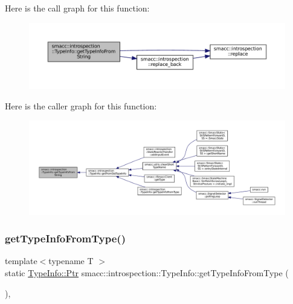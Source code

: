 Here is the call graph for this function\+:
\nopagebreak
\begin{figure}[H]
\begin{center}
\leavevmode
\includegraphics[width=350pt]{classsmacc_1_1introspection_1_1TypeInfo_a47d65b6c61499d7ae8ab9f6325c84837_cgraph}
\end{center}
\end{figure}
Here is the caller graph for this function\+:
\nopagebreak
\begin{figure}[H]
\begin{center}
\leavevmode
\includegraphics[width=350pt]{classsmacc_1_1introspection_1_1TypeInfo_a47d65b6c61499d7ae8ab9f6325c84837_icgraph}
\end{center}
\end{figure}
\mbox{\label{classsmacc_1_1introspection_1_1TypeInfo_a8716ca6ac890b4582986d9fe4f5962ad}} 
\subsubsection{\texorpdfstring{get\+Type\+Info\+From\+Type()}{getTypeInfoFromType()}}
{\footnotesize\ttfamily template$<$typename T $>$ \\
static \hyperlink{classsmacc_1_1introspection_1_1TypeInfo_aa6ffd9c39811d59f7c771941b7fad860}{Type\+Info\+::\+Ptr} smacc\+::introspection\+::\+Type\+Info\+::get\+Type\+Info\+From\+Type (\begin{DoxyParamCaption}{ }\end{DoxyParamCaption})\hspace{0.3cm}{\ttfamily [inline]}, {\ttfamily [static]}}




